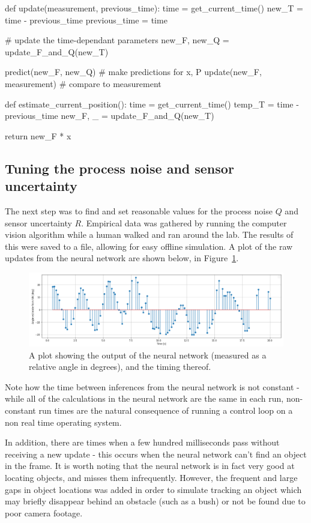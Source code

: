 \begin{python}
def update(measurement, previous_time):
	time = get_current_time()
	new_T = time - previous_time
	previous_time = time
	
	# update the time-dependant parameters
	new_F, new_Q = update_F_and_Q(new_T)
	
	predict(new_F, new_Q) # make predictions for x, P
	update(new_F, measurement) # compare to measurement

def estimate_current_position():
	time = get_current_time()
	temp_T = time - previous_time
	new_F, _ = update_F_and_Q(new_T)
	
	return new_F * x
\end{python}

\subsection{Tuning the process noise and sensor uncertainty}
The next step was to find and set reasonable values for the process noise $Q$ and sensor uncertainty $R$. Empirical data was gathered by running the computer vision algorithm while a human walked and ran around the lab. The results of this were saved to a file, allowing for easy offline simulation. A plot of the raw updates from the neural network are shown below, in Figure~\ref{fig:raw_nn_results}.

\begin{figure}[h!]
  \centering
  \includegraphics[width=\textwidth]{methodology/raw_nn_results}
  \caption{\label{fig:raw_nn_results} A plot showing the output of the neural network (measured as a relative angle in degrees), and the timing thereof.}
\end{figure}

Note how the time between inferences from the neural network is not constant - while all of the calculations in the neural network are the same in each run, non-constant run times are the natural consequence of running a control loop on a non real time operating system.

In addition, there are times when a few hundred milliseconds pass without receiving a new update - this occurs when the neural network can't find an object in the frame. It is worth noting that the neural network is in fact very good at locating objects, and misses them infrequently. However, the frequent and large gaps in object locations was added in order to simulate tracking an object which may briefly disappear behind an obstacle (such as a bush) or not be found due to poor camera footage.

